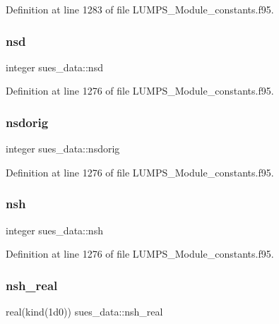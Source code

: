 Definition at line 1283 of file L\+U\+M\+P\+S\+\_\+\+Module\+\_\+constants.\+f95.

\mbox{\label{namespacesues__data_a1fd9bd64afb3354e7e90260d0f0c6e94}} 
\subsubsection{\texorpdfstring{nsd}{nsd}}
{\footnotesize\ttfamily integer sues\+\_\+data\+::nsd}



Definition at line 1276 of file L\+U\+M\+P\+S\+\_\+\+Module\+\_\+constants.\+f95.

\mbox{\label{namespacesues__data_aa6fc5b2432c730d5b950fa2b37ac4630}} 
\subsubsection{\texorpdfstring{nsdorig}{nsdorig}}
{\footnotesize\ttfamily integer sues\+\_\+data\+::nsdorig}



Definition at line 1276 of file L\+U\+M\+P\+S\+\_\+\+Module\+\_\+constants.\+f95.

\mbox{\label{namespacesues__data_ab28124e60c813d253c9b095050fe3ebe}} 
\subsubsection{\texorpdfstring{nsh}{nsh}}
{\footnotesize\ttfamily integer sues\+\_\+data\+::nsh}



Definition at line 1276 of file L\+U\+M\+P\+S\+\_\+\+Module\+\_\+constants.\+f95.

\mbox{\label{namespacesues__data_ab2070158f8b88b8f7835232841061718}} 
\subsubsection{\texorpdfstring{nsh\+\_\+real}{nsh\_real}}
{\footnotesize\ttfamily real(kind(1d0)) sues\+\_\+data\+::nsh\+\_\+real}



